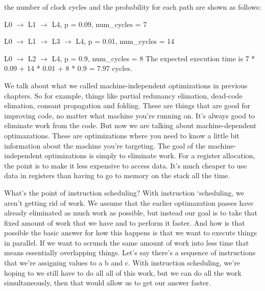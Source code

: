 \begin{problem}
\begin{enumerate}
{\begin{center}
	\end{center}

	the number of clock cycles and the probability for each path are shown as follows:
\item L0 $\rightarrow$ L1 $\rightarrow$ L4, p = 0.09, num\_cycles = 7
\item L0 $\rightarrow$ L1 $\rightarrow$ L3 $\rightarrow$ L4, p = 0.01, num\_cycles = 14
\item L0 $\rightarrow$ L2 $\rightarrow$ L4, p = 0.9, num\_cycles = 8
The expected execution time is 7 * 0.09 + 14 * 0.01 + 8 * 0.9 = 7.97 cycles.
	}
	\end{enumerate}
	
	\end{problem}
	



We talk about what we called
machine-independent optimizations in previous chapters. So for example, things like
partial redunancy elimation, dead-code elimation, consant propagation and
folding. These are things that are good for improving code, no matter
what machine you're running on. It's always good to eliminate work
from the code. But now we are talking about machine-dependent optimazations.
These are optimizations where you need to know a little bit information
about the machine you're targeting. The goal of the machine-independent
optimizations is simply to eliminate work. For a register allocation, the point
is to make it less expensive to access data. It's much cheaper to use data in
registers than having to go to memory on the stack all the time.

What's the point of instruction scheduling? With instruction `scheduling,
we aren't getting rid of work. We assume that the earlier optimazation passes have
already eliminated as much work as possible, but instead our goal is to take that
fixed amount of work that we have and to perform it faster. And how is that possible
the basic answer for how this happens is that we want to execute things in parallel.
If we want to scrunch the same amount of work into less time that means essentially
overlapping things. Let's say there's a sequence of instructions that we're assigning
values to a b and c. With instruction scheduling, we're hoping to we still have to do all
all of this work, but we can do all the work simultaneously, then that would allow
us to get our answer faster.


